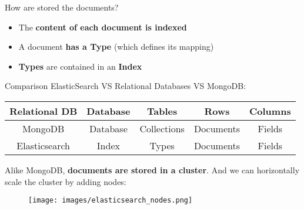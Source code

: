 \documentclass{beamer}[10pt, usepdftitle=false handout]
\begin{document}
\begin{frame}
How are stored the documents?
\vspace*{0.6em}

\begin{itemize}
\item{The \textbf{content of each document is indexed}}
\item{A document \textbf{has a Type} (which defines its mapping)}
\item{\textbf{Types} are contained in an \textbf{Index}}
\end{itemize}
\vspace*{0.6em}

Comparison ElasticSearch VS Relational Databases VS MongoDB:
\vspace*{0.6em}

\begin{center}
\begin{tabular}{c|c|c|c|c}
Relational DB & Database & Tables & Rows & Columns  \\ \hline
MongoDB & Database & Collections & Documents & Fields  \\ \hline
Elasticsearch & Index & Types & Documents & Fields\\ 
\end{tabular}
\end{center}


\end{frame}
\begin{frame}
Alike MongoDB, \textbf{documents are stored in a cluster}. And we can horizontally scale the cluster by adding nodes:
\vspace*{0.6em}

\begin{figure}
	\texttt{[image: images/elasticsearch\_nodes.png]} 
\end{figure}	

\end{frame}
\end{document}
